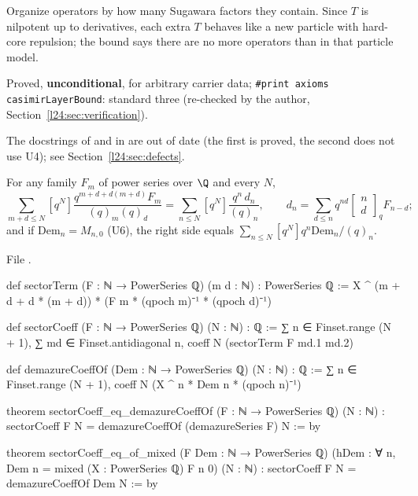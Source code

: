 \begin{physics}
Organize operators by how many Sugawara factors they contain. Since $T$ is nilpotent up to derivatives, each
extra $T$ behaves like a new particle with hard-core repulsion; the bound says there are no more operators than in
that particle model.
\end{physics}

\begin{status}
Proved, \textbf{unconditional}, for arbitrary carrier data; \texttt{\#print axioms casimirLayerBound}: standard three
(re-checked by the author, Section~\ref{l24:sec:verification}).
\end{status}

The docstrings of  and  in  are out of
date (the first is proved, the second does not use U4); see Section~\ref{l24:sec:defects}.

\begin{theorem}\label{l24:thm:D3}
For any family $F_m$ of power series over $\Q$ and every $N$,
\begin{equation*}
\sum_{m+d\le N}[q^N]\frac{q^{m+d+d(m+d)}F_m}{(q)_m(q)_d}=\sum_{n\le N}[q^N]\frac{q^n\,d_n}{(q)_n},\qquad
d_n=\sum_{d\le n}q^{nd}\begin{bmatrix}n\\d\end{bmatrix}_qF_{n-d};
\end{equation*}
and if $\mathrm{Dem}_n=M_{n,0}$ (U6), the right side equals $\sum_{n\le N}[q^N]q^n\mathrm{Dem}_n/(q)_n$.
\end{theorem}
\noindent File .
\begin{leancode}
def sectorTerm (F : ℕ → PowerSeries ℚ) (m d : ℕ) : PowerSeries ℚ :=
  X ^ (m + d + d * (m + d)) * (F m * (qpoch m)⁻¹ * (qpoch d)⁻¹)

def sectorCoeff (F : ℕ → PowerSeries ℚ) (N : ℕ) : ℚ :=
  ∑ n ∈ Finset.range (N + 1), ∑ md ∈ Finset.antidiagonal n, coeff N (sectorTerm F md.1 md.2)

def demazureCoeffOf (Dem : ℕ → PowerSeries ℚ) (N : ℕ) : ℚ :=
  ∑ n ∈ Finset.range (N + 1), coeff N (X ^ n * Dem n * (qpoch n)⁻¹)

theorem sectorCoeff_eq_demazureCoeffOf (F : ℕ → PowerSeries ℚ) (N : ℕ) :
    sectorCoeff F N = demazureCoeffOf (demazureSeries F) N := by

theorem sectorCoeff_eq_of_mixed (F Dem : ℕ → PowerSeries ℚ)
    (hDem : ∀ n, Dem n = mixed (X : PowerSeries ℚ) F n 0) (N : ℕ) :
    sectorCoeff F N = demazureCoeffOf Dem N := by
\end{leancode}

